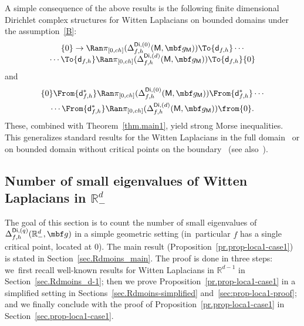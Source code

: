 \begin{remark}\label{rem:Morse}
A simple consequence of the above results is the following finite
dimensional Dirichlet complex structures for Witten Laplacians on
bounded domains under the assumption~\ref{B}:
\begin{multline*}\vspace*{-5pt}
\{0\} \to
\Ran \pi_{[0,ch]}(\Delta^{\mathsf{Di},(0)}_{f,h}(\mathsf M,\mbf
g_{\mathsf M})) \To{\mathsf d_{f,h}}\cdots\\
\cdots
\To{\mathsf d_{f,h}}
\Ran \pi_{[0,ch]}(\Delta^{\mathsf{Di},(d)}_{f,h}(\mathsf M,\mbf
g_{\mathsf M})) \To{\mathsf d_{f,h}}\{0\}
\end{multline*}
and\vspace*{-5pt}
\begin{multline*}
\{0\} \From{\mathsf d_{f,h}^*}
\Ran \pi_{[0,ch]}(\Delta^{\mathsf{Di},(0)}_{f,h}(\mathsf M,\mbf g_{\mathsf
M})) \From{\mathsf d_{f,h}^*} \cdots\\
\cdots \From{\mathsf
d_{f,h}^*} \Ran \pi_{[0,ch]}(\Delta^{\mathsf{Di},(d)}_{f,h}(\mathsf
M,\mbf g_{\mathsf M})) \from\{0\}.
\end{multline*}
These, combined with Theorem~\ref{thm.main1}, yield strong Morse
inequalities. This generalizes standard results for the Witten Laplacians in the
full domain~\cite{helffer-sjostrand-85,CFKS,witten-82} or on bounded domain without critical points on
the
boundary~\cite{helffer-nier-06,le-peutrec-10} (see also~\cite{laudenbach2011morse,CL}).
\end{remark}

\subsection{Number of small eigenvalues of Witten Laplacians in $\mathbb R^d_-$}\label{sec.Rdmoins}

The goal of this section is to
count the number of small eigenvalues of $\Delta_{f,h}^{\mathsf{Di},(q)} (\mathbb R^d_-,\mbf g)$ in a simple geometric setting (in~particular
$f$ has a single critical point, located at $0$). The main result
(Proposition~\ref{pr.prop-loca1-case1}) is
stated in Section~\ref{sec.Rdmoins_main}. The proof is done in three
steps: we~first recall well-known results for Witten Laplacians in
$\mathbb R^{d-1}$ in Section~\ref{sec.Rdmoins_d-1}; then we prove Proposition~\ref{pr.prop-loca1-case1}
in a simplified setting in Sections~\ref{sec.Rdmoins-simplified}
and~\ref{sec:prop-loca1-proof}; and we finally conclude with the proof
of Proposition~\ref{pr.prop-loca1-case1} in Section~\ref{sec.prop-loca1-case1}.

